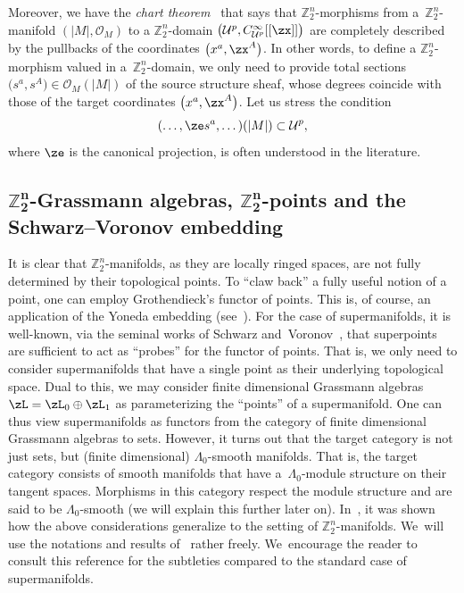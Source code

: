 \documentclass[10pt,a4paper]{amsart}
\newcommand{\Z}{{\mathbb Z}}
\def\cO{\mathcal{O}}
\newcommand{\0}{\otimes}
\numberwithin{equation}{section}
\begin{document}
Moreover, we have the \emph{chart theorem}~\cite[Theorem 7.10]{Covolo:2016} that says that $\Z_2^n$-morphisms from a~$\Z_2^n$-manifold $(|M|,\cO_M)$ to a $\Z_2^n$-domain $\big(\mathcal{U}^p,C^\infty_{\mathcal{U}^p}[[\zx]]\big)$ are completely described by the pullbacks of the coordinates $\big(x^a,\zx^A\big)$. In other words, to define a $\Z_2^n$-morphism valued in a~$\Z_2^n$-domain, we only need to provide total sections $\big(s^a,s^A\big)\in\cO_M(|M|)$ of the source structure sheaf, whose degrees coincide with those of the target coordinates $\big(x^a,\zx^A\big)$. Let us stress the condition
\[
(\dots,\ze s^a,\dots)(|M|)\subset \mathcal{U}^p,
\]
where $\ze$ is the canonical projection, is often understood in the literature.

\subsection[Z2n-Grassmann algebras, Z2n-points and the Schwarz--Voronov embedding]
{$\boldsymbol{\Z_2^n}$-Grassmann algebras, $\boldsymbol{\Z_2^n}$-points and the Schwarz--Voronov embedding}

It is clear that $\Z_2^n$-manifolds, as they are locally ringed spaces, are not fully determined by their topological points. To ``claw back'' a fully useful notion of a point, one can employ Grothendieck's functor of points. This is, of course, an application of the Yoneda embedding (see~\cite[Chapter~III, Section~2]{MacLane1998}). For the case of supermanifolds, it is well-known, via the seminal works of Schwarz and~Voronov~\cite{Schwarz:1982,Schwarz:1984,Voronov:1984}, that superpoints are sufficient to act as ``probes'' for the functor of points. That is, we only need to consider supermanifolds that have a single point as their underlying topological space. Dual to this, we may consider finite dimensional Grassmann algebras $\zL=\zL_0\oplus \zL_1$ as parameterizing the ``points'' of a supermanifold. One can thus view supermanifolds as functors from the category of finite dimensional Grassmann algebras to sets. However, it turns out that the target category is not just sets, but (finite dimensional) $\Lambda_0$-smooth manifolds. That is, the target category consists of smooth manifolds that have a~$\Lambda_0$-module structure on their tangent spaces. Morphisms in this category respect the module structure and are said to be $\Lambda_0$-smooth (we will explain this further later on). In~\cite{Bruce:2019b}, it was shown how the above considerations generalize to the setting of $\Z_2^n$-manifolds. We~will use the notations and results of~\cite{Bruce:2019b} rather freely. We~encourage the reader to consult this reference for the subtleties compared to the standard case of supermanifolds.
\end{document}
